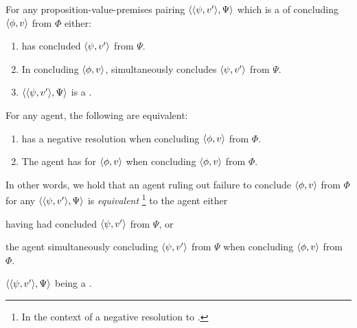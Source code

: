 \begin{note}
\begin{idea}[\izetaS{}]
\begin{itemize}
\begin{enumerate}[label=\arabic*., ref=\named{CS:\arabic*}]
      \label{idea:zetaS::requ}
      For any proposition-value-premises pairing \(\langle \langle \psi, v' \rangle, \Psi \rangle\) which is a \requ{} of concluding \(\langle \phi, v \rangle\) from \(\Phi\) either:
      \begin{enumerate}[label=\alph*., ref=\named{CS:1.\alph*}]
      \item
        \label{idea:zetaS::requ-sat:Past}
        \vAgent{} has concluded \(\langle \psi, v' \rangle\) from \(\Psi\).
      \item
        \label{idea:zetaS::requ-sat:Pres}
        In concluding \(\langle \phi, v \rangle\), \vAgent{} simultaneously concludes \(\langle \psi, v' \rangle\) from \(\Psi\).
      \item
        \label{idea:zetaS::requ-sat:Forgone}
        \(\langle \langle \psi, v' \rangle, \Psi \rangle\) is a .
      \end{enumerate}
    \end{enumerate}
  \end{itemize}
  \vspace{-\baselineskip}
  \end{idea}
\end{note}

\begin{note}
    \begin{proposition}
    \label{prop:qzs-tick-equals-iCS}
    For any agent, the following are equivalent:
    \begin{enumerate}[label=\arabic*., ref=(\arabic*)]
    \item
      \label{prop:qzs-tick-equals-iCS:qzS}
      \qzS{} has a negative resolution when concluding \(\langle \phi, v \rangle\) from \(\Phi\).
    \item
      \label{prop:qzs-tick-equals-iCS:ZS}
      The agent has \zetaS{} for \(\langle \phi, v \rangle\) when concluding \(\langle \phi, v \rangle\) from \(\Phi\).
    \end{enumerate}
    \vspace{-\baselineskip}
  \end{proposition}
  In other words, we hold that an agent ruling out failure to conclude \(\langle \phi, v \rangle\) from \(\Phi\) for any \requ{} \(\langle \langle \psi, v' \rangle, \Psi \rangle\) is \emph{equivalent}%
  \footnote{
    In the context of a negative resolution to \qzS{}.
  }
  to the agent either
  \begin{enumerate*}[label=(\alph*)]
  \item
    having had concluded \(\langle \psi, v' \rangle\) from \(\Psi\), or
  \item
    the agent simultaneously concluding \(\langle \psi, v' \rangle\) from \(\Psi\) when concluding \(\langle \phi, v \rangle\) from \(\Phi\).
  \item
    \(\langle \langle \psi, v' \rangle, \Psi \rangle\) being a .
  \end{enumerate*}
\end{note}


